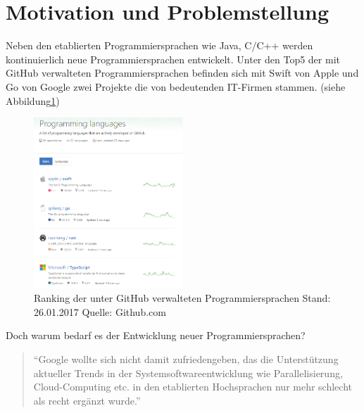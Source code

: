 \documentclass[
    paper=a4,
    bibtotocnumbered,
    liststotocnumbered,
    oneside,
    12pt,
    listof=totoc,
    toc=chapterentrywithdots,
    listof=entryprefix,
]{scrartcl}
\begin{document}

\section{Motivation und Problemstellung}
Neben den etablierten Programmiersprachen wie Java, C/C++ werden kontinuierlich neue Programmiersprachen entwickelt. 
Unter den Top5 der mit GitHub verwalteten Programmiersprachen befinden sich mit Swift von Apple und Go von Google zwei Projekte die von bedeutenden IT-Firmen stammen. (siehe Abbildung\ref{figure:github})

	\begin{figure}[h]
	\centering
	\includegraphics[width=0.5\textwidth]{Images/github}
	\caption{Ranking der unter GitHub verwalteten Programmiersprachen Stand: 26.01.2017 Quelle: Github.com}%
	\label{figure:github}%
	\end{figure}

Doch warum bedarf es der Entwicklung neuer Programmiersprachen?
\begin{quote}
\enquote{Google wollte sich nicht damit zufriedengeben, das die Unterstützung aktueller Trends in der Systemsoftwareentwicklung wie Parallelisierung, Cloud-Computing etc. in den etablierten Hochsprachen nur mehr schlecht als recht ergänzt wurde.} \cite{Feike2011}
\end{quote}
\end{document}
